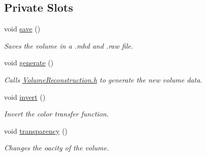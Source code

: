 \subsection*{Private Slots}
\begin{DoxyCompactItemize}
\item 
void \hyperlink{class_volume_reconstruction_widget_a610fbb01abf2c0a69c143304233170ac}{save} ()
\begin{DoxyCompactList}\small\item\em Saves the volume in a .mhd and .raw file. \end{DoxyCompactList}\item 
void \hyperlink{class_volume_reconstruction_widget_a65ed7b767a7e256539b4f4cdeebe8a3f}{generate} ()
\begin{DoxyCompactList}\small\item\em Calls \hyperlink{_volume_reconstruction_8h}{Volume\-Reconstruction.\-h} to generate the new volume data. \end{DoxyCompactList}\item 
void \hyperlink{class_volume_reconstruction_widget_abdcc0d358ef82fecdc093b534b11c08c}{invert} ()
\begin{DoxyCompactList}\small\item\em Invert the color transfer function. \end{DoxyCompactList}\item 
void \hyperlink{class_volume_reconstruction_widget_afef1bd7aa84184b34065beb91e858edc}{transparency} ()
\begin{DoxyCompactList}\small\item\em Changes the oacity of the volume. \end{DoxyCompactList}\end{DoxyCompactItemize}
